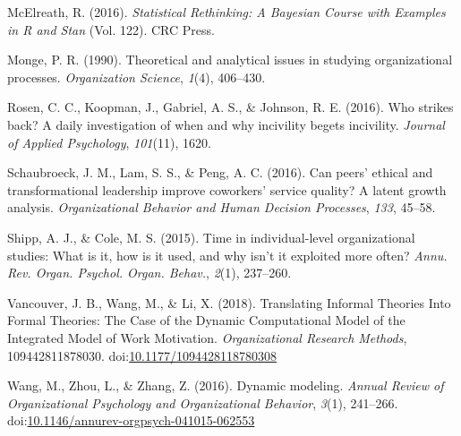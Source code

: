 \documentclass[english,,man]{apa6}
\theoremstyle{definition}
\theoremstyle{definition}
\theoremstyle{definition}
\theoremstyle{remark}
\begin{document}
\leavevmode\hypertarget{ref-mcelreath_statistical_2016}{}%
McElreath, R. (2016). \emph{Statistical Rethinking: A Bayesian Course
with Examples in R and Stan} (Vol. 122). CRC Press.

\leavevmode\hypertarget{ref-monge_theoretical_1990}{}%
Monge, P. R. (1990). Theoretical and analytical issues in studying
organizational processes. \emph{Organization Science}, \emph{1}(4),
406--430.

\leavevmode\hypertarget{ref-rosen_who_2016}{}%
Rosen, C. C., Koopman, J., Gabriel, A. S., \& Johnson, R. E. (2016). Who
strikes back? A daily investigation of when and why incivility begets
incivility. \emph{Journal of Applied Psychology}, \emph{101}(11), 1620.

\leavevmode\hypertarget{ref-schaubroeck_can_2016}{}%
Schaubroeck, J. M., Lam, S. S., \& Peng, A. C. (2016). Can peers'
ethical and transformational leadership improve coworkers' service
quality? A latent growth analysis. \emph{Organizational Behavior and
Human Decision Processes}, \emph{133}, 45--58.

\leavevmode\hypertarget{ref-shipp_time_2015}{}%
Shipp, A. J., \& Cole, M. S. (2015). Time in individual-level
organizational studies: What is it, how is it used, and why isn't it
exploited more often? \emph{Annu. Rev. Organ. Psychol. Organ. Behav.},
\emph{2}(1), 237--260.

\leavevmode\hypertarget{ref-vancouver_translating_2018}{}%
Vancouver, J. B., Wang, M., \& Li, X. (2018). Translating Informal
Theories Into Formal Theories: The Case of the Dynamic Computational
Model of the Integrated Model of Work Motivation. \emph{Organizational
Research Methods}, 109442811878030.
doi:\href{https://doi.org/10.1177/1094428118780308}{10.1177/1094428118780308}

\leavevmode\hypertarget{ref-Wang2016}{}%
Wang, M., Zhou, L., \& Zhang, Z. (2016). Dynamic modeling. \emph{Annual
Review of Organizational Psychology and Organizational Behavior},
\emph{3}(1), 241--266.
doi:\href{https://doi.org/10.1146/annurev-orgpsych-041015-062553}{10.1146/annurev-orgpsych-041015-062553}
\end{document}
